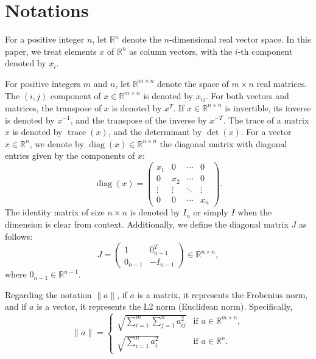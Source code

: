 \section{Notations}\label{sec:notation}


For a positive integer $n$, let $\mathbb{R}^n$ denote the $n$-dimensional real vector space.
In this paper, we treat elements $x$ of $\mathbb{R}^n$ as column vectors, with the $i$-th component denoted by $x_i$.

For positive integers $m$ and $n$, let $\mathbb{R}^{m \times n}$ denote the space of $m \times n$ real matrices.
The $(i,j)$ component of $x \in \mathbb{R}^{m \times n}$ is denoted by $x_{ij}$.
For both vectors and matrices, the transpose of $x$ is denoted by $x^T$.
If $x \in \mathbb{R}^{n \times n}$ is invertible, its inverse is denoted by $x^{-1}$, and the transpose of the inverse by $x^{-T}$.
The trace of a matrix $x$ is denoted by $\operatorname{trace}(x)$, and the determinant by $\operatorname{det}(x)$.
For a vector $x \in \mathbb{R}^n$, we denote by $\operatorname{diag}(x) \in \mathbb{R}^{n \times n}$ the diagonal matrix with diagonal entries given by the components of $x$:
\[
\operatorname{diag}(x) = \begin{pmatrix}
x_1 & 0 & \cdots & 0 \\
0 & x_2 & \cdots & 0 \\
\vdots & \vdots & \ddots & \vdots \\
0 & 0 & \cdots & x_n
\end{pmatrix}.
\]
The identity matrix of size $n \times n$ is denoted by $I_n$ or simply $I$ when the dimension is clear from context.
Additionally, we define the diagonal matrix $J$ as follows:
\[
    J = \begin{pmatrix}
        1 & 0_{n-1}^T \\
        0_{n-1} & -I_{n-1}
    \end{pmatrix} \in \mathbb{R}^{n \times n},
\]
where $0_{n-1} \in \mathbb{R}^{n-1}$.

Regarding the notation $\|a\|$, if $a$ is a matrix, it represents the Frobenius norm, and if $a$ is a vector, it represents the L2 norm (Euclidean norm).
Specifically,
\[
\|a\| = 
\begin{cases}
    \sqrt{\sum_{i=1}^m \sum_{j=1}^n a_{ij}^2} & \text{if } a \in \mathbb{R}^{m \times n},\\
    \sqrt{\sum_{i=1}^n a_i^2} & \text{if } a \in \mathbb{R}^n.
\end{cases}
\]

